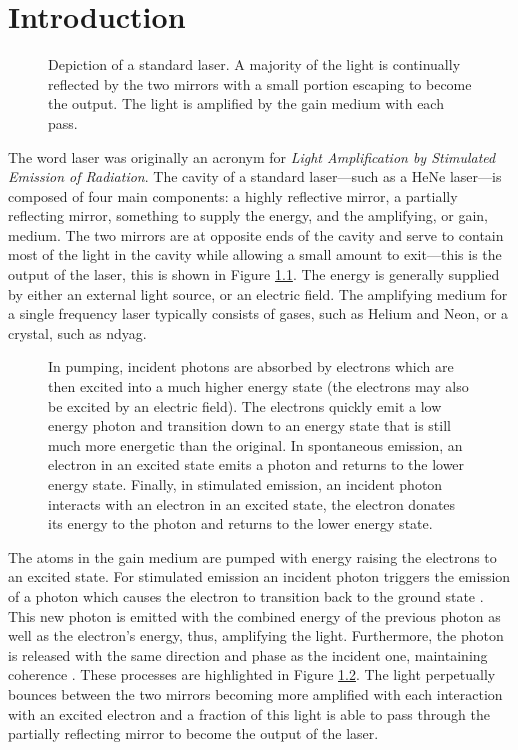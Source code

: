 
\chapter{Introduction}

\begin{figure}[tbp]
\centering

\caption{Depiction of a standard laser. A majority of the light is continually reflected by the two mirrors with a small portion escaping to become the output. The light is amplified by the gain medium with each pass.}
\label{fig:laser}
\end{figure}

The word laser was originally an acronym for \emph{Light Amplification by Stimulated Emission of Radiation}. The cavity of a standard laser---such as a HeNe laser---is composed of four main components: a highly reflective mirror, a partially reflecting mirror, something to supply the energy, and the amplifying, or gain, medium. The two mirrors are at opposite ends of the cavity and serve to contain most of the light in the cavity while allowing a small amount to exit---this is the output of the laser, this is shown in Figure \ref{fig:laser}. The energy is generally supplied by either an external light source, or an electric field. The amplifying medium for a single frequency laser typically consists of gases, such as Helium and Neon, or a crystal, such as \gls{ndyag}. \\

\begin{figure}[tbp]
\centering

\caption[Comparison of pumping, spontaneous emission, and stimulated emission.]{In pumping, incident photons are absorbed by electrons which are then excited into a much higher energy state (the electrons may also be excited by an electric field). The electrons quickly emit a low energy photon and transition down to an energy state that is still much more energetic than the original. In spontaneous emission, an electron in an excited state emits a photon and returns to the lower energy state. Finally, in stimulated emission, an incident photon interacts with an electron in an excited state, the electron donates its energy to the photon and returns to the lower energy state.}
\label{fig:emission}
\end{figure}

The atoms in the gain medium are pumped with energy raising the electrons to an excited state. For stimulated emission an incident photon triggers the emission of a photon which causes the electron to transition back to the ground state \cite{alazzawi}. This new photon is emitted with the combined energy of the previous photon as well as the electron's energy, thus, amplifying the light. Furthermore, the photon is released with the same direction and phase as the incident one, maintaining coherence \cite{alazzawi}. These processes are highlighted in Figure \ref{fig:emission}. The light perpetually bounces between the two mirrors becoming more amplified with each interaction with an excited electron and a fraction of this light is able to pass through the partially reflecting mirror to become the output of the laser. \\

